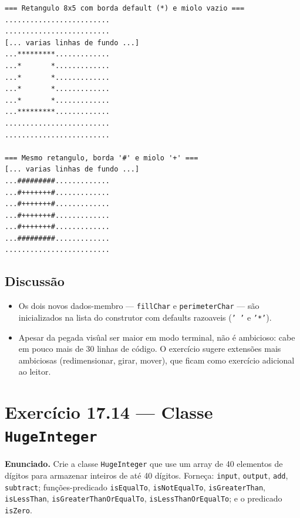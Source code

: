 \documentclass[11pt,a4paper]{article}
\begin{document}
\begin{saidabox}
\begin{lstlisting}[style=terminal]
=== Retangulo 8x5 com borda default (*) e miolo vazio ===
.........................
.........................
[... varias linhas de fundo ...]
...*********.............
...*       *.............
...*       *.............
...*       *.............
...*       *.............
...*********.............
.........................
.........................

=== Mesmo retangulo, borda '#' e miolo '+' ===
[... varias linhas de fundo ...]
...#########.............
...#+++++++#.............
...#+++++++#.............
...#+++++++#.............
...#+++++++#.............
...#########.............
.........................
\end{lstlisting}
\end{saidabox}

\subsection*{Discuss\~ao}

\begin{itemize}[leftmargin=*]
  \item Os dois novos dados-membro --- \texttt{fillChar} e \texttt{perimeterChar} --- s\~ao inicializados na lista do construtor com defaults razoaveis (\texttt{' '} e \texttt{'*'}).
  \item Apesar da pegada vis\^ual ser maior em modo terminal, n\~ao \'e ambicioso: cabe em pouco mais de 30 linhas de c\'odigo. O exerc\'icio sugere extens\~oes mais ambiciosas (redimensionar, girar, mover), que ficam como exerc\'icio adicional ao leitor.
\end{itemize}

\newpage
\section{Exerc\'icio 17.14 --- Classe \texttt{HugeInteger}}

\begin{enunciado}
\textbf{Enunciado.} Crie a classe \texttt{HugeInteger} que use um array de 40 elementos de d\'igitos para armazenar inteiros de at\'e 40 d\'igitos. Forne\c{c}a: \texttt{input}, \texttt{output}, \texttt{add}, \texttt{subtract}; fun\c{c}\~oes-predicado \texttt{isEqualTo}, \texttt{isNotEqualTo}, \texttt{isGreaterThan}, \texttt{isLessThan}, \texttt{isGreaterThanOrEqualTo}, \texttt{isLessThanOrEqualTo}; e o predicado \texttt{isZero}.
\end{enunciado}
\end{document}
